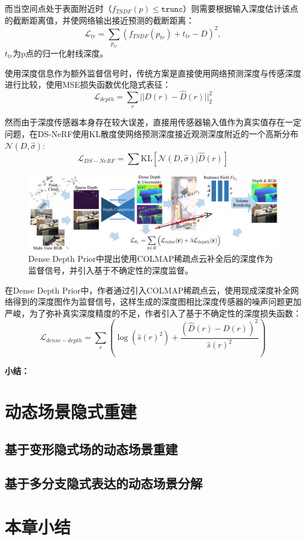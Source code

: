 而当空间点处于表面附近时（$f_{TSDF}(p) \leq \mathtt{trunc}$）则需要根据输入深度估计该点的截断距离值，并使网络输出接近预测的截断距离：
\begin{equation}
    \mathcal{L}_{tr} = \sum_{p_{tr}}(f_{TSDF}(p_{tr})+t_{tr}-D)^2,
\end{equation}
$t_{tr}$为p点的归一化射线深度。

使用深度信息作为额外监督信号时，传统方案是直接使用网络预测深度与传感深度进行比较，使用MSE损失函数优化隐式表征：
\begin{equation}
    \mathcal{L}_{depth}=\sum_r||D(r)-\hat{D}(r)||_2^2
\end{equation}

然而由于深度传感器本身存在较大误差，直接用传感器输入值作为真实值存在一定问题，在DS-NeRF\cite{deng_depth-supervised_2022}使用KL散度使网络预测深度接近观测深度附近的一个高斯分布$\mathcal{N}(D, \hat{\sigma})$:
\begin{equation}
    \mathcal{L}_{DS-NeRF} = \sum\text{KL}[\mathcal{N}(D,\hat{\sigma}) | \hat{D}(r)]
\end{equation}

\begin{figure}[ht]
    \centering
    \includegraphics[width=\textwidth]{undergraduate-thesis/images/dense-depth prior.png}
    \caption{Dense Depth Prior\cite{roessle_dense_2022}中提出使用COLMAP\cite{schonberger_structure--motion_2016}稀疏点云补全后的深度作为监督信号，并引入基于不确定性的深度监督。}
    \label{fig:related-work dense depth prior}
\end{figure}

在Dense Depth Prior\cite{roessle_dense_2022}中，作者通过引入COLMAP\cite{schonberger_structure--motion_2016}稀疏点云，使用现成深度补全网络得到的深度图作为监督信号，这样生成的深度图相比深度传感器的噪声问题更加严峻，为了弥补真实深度精度的不足，作者引入了基于不确定性的深度损失函数：
\begin{equation}
    \mathcal{L}_{dense-depth}=\sum_r\left(\log(\hat{s}(r)^2)+\frac{(\hat{D}(r)-D(r))^2}{\hat{s}(r)^2}\right)
\end{equation}

\noindent\textbf{小结：}

\newpage
\section{动态场景隐式重建}

\subsection{基于变形隐式场的动态场景重建}

\subsection{基于多分支隐式表达的动态场景分解}

\section{本章小结}